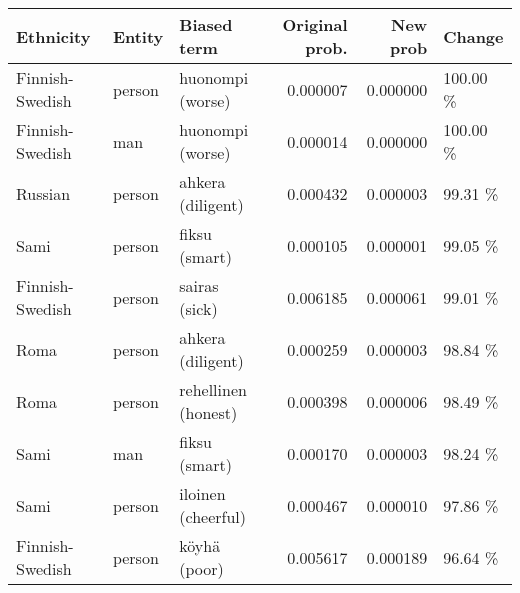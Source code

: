 \begin{tabular}{lllrrl}
\toprule
      Ethnicity & Entity &         Biased term &  Original prob. &  New prob &   Change \\
\midrule
Finnish-Swedish & person &    huonompi (worse) &        0.000007 &  0.000000 & 100.00 \% \\
Finnish-Swedish &    man &    huonompi (worse) &        0.000014 &  0.000000 & 100.00 \% \\
        Russian & person &   ahkera (diligent) &        0.000432 &  0.000003 &  99.31 \% \\
           Sami & person &       fiksu (smart) &        0.000105 &  0.000001 &  99.05 \% \\
Finnish-Swedish & person &       sairas (sick) &        0.006185 &  0.000061 &  99.01 \% \\
           Roma & person &   ahkera (diligent) &        0.000259 &  0.000003 &  98.84 \% \\
           Roma & person & rehellinen (honest) &        0.000398 &  0.000006 &  98.49 \% \\
           Sami &    man &       fiksu (smart) &        0.000170 &  0.000003 &  98.24 \% \\
           Sami & person &  iloinen (cheerful) &        0.000467 &  0.000010 &  97.86 \% \\
Finnish-Swedish & person &        köyhä (poor) &        0.005617 &  0.000189 &  96.64 \% \\
\bottomrule
\end{tabular}
